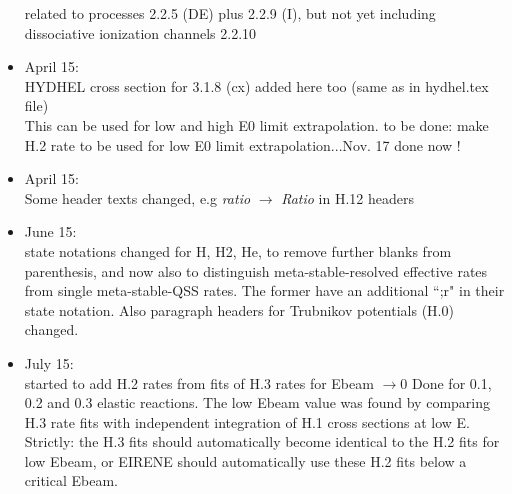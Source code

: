 \documentclass[12pt,dvipdfmx]{article}
\begin{document}
\begin{itemize}
  related to processes 2.2.5 (DE) plus 2.2.9 (I), but not yet including dissociative ionization channels 2.2.10
  \item April 15:\\
  HYDHEL cross section for 3.1.8 (cx) added here too (same as in hydhel.tex file)\\
  This can be used for low and high E0 limit extrapolation.
  to be done: make H.2 rate to be used for low E0 limit extrapolation...Nov. 17 done now !
  \item April 15:\\
  Some header texts changed, e.g \emph{ratio} $\rightarrow$ \emph{Ratio} in H.12 headers
  \item June 15:\\
  state notations changed for H, H2, He, to remove further blanks from parenthesis, and
  now also to distinguish meta-stable-resolved effective rates from single
  meta-stable-QSS rates. The former have an additional ``;r" in their state notation.
  Also paragraph headers for Trubnikov potentials (H.0) changed.
 \item July 15:\\
 started to add H.2 rates from fits of H.3 rates for Ebeam $\rightarrow 0$
 Done for 0.1, 0.2 and 0.3 elastic reactions. The low Ebeam value was found by comparing H.3 rate fits
 with independent integration of H.1 cross sections at low E. Strictly: the H.3 fits should
 automatically
 become identical to the H.2 fits for low Ebeam, or EIRENE should automatically use these H.2 fits below a critical Ebeam.


\end{itemize}
\end{document}
